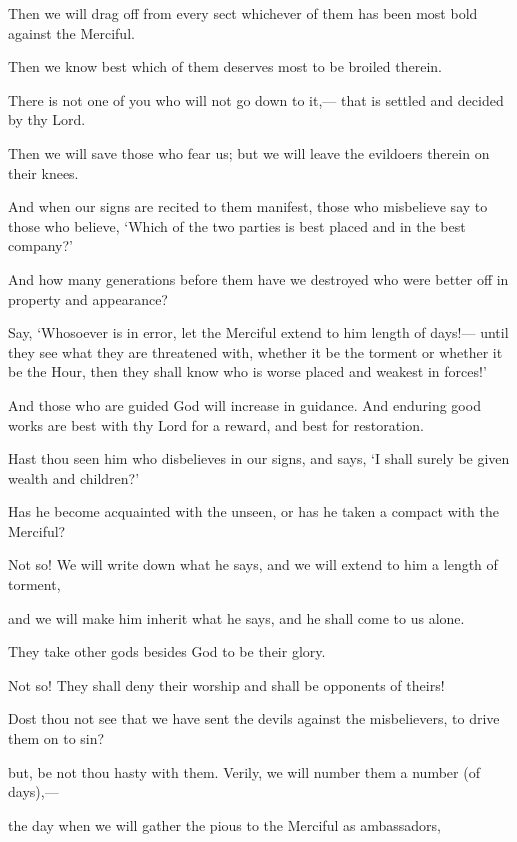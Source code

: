\documentclass[fontsize=14pt, letterpaper, notitlepage, openany, DIV=12]{scrbook} %
\begin{document}
\noindent[19:69]
Then we will drag off from every sect whichever of them has been most bold against the
Merciful.

\noindent[19:70]
Then we know best which of them deserves most to be broiled therein.

\noindent[19:71]
There is not one of you who will not go down to it,--- that is settled and decided by thy
Lord.

\noindent[19:72]
Then we will save those who fear us; but we will leave the evildoers therein on their
knees.

\noindent[19:73]
And when our signs are recited to them manifest, those who misbelieve say to those who
believe, `Which of the two parties is best placed and in the best company?'

\noindent[19:74]
And how many generations before them have we destroyed who were better off in
property and appearance?

\noindent[19:75]
Say, `Whosoever is in error, let the Merciful extend to him length of days!--- until they
see what they are threatened with, whether it be the torment or whether it be the Hour, then they
shall know who is worse placed and weakest in forces!'

\noindent[19:76]
And those who are guided God will increase in guidance. And enduring good works are
best with thy Lord for a reward, and best for restoration.

\noindent[19:77]
Hast thou seen him who disbelieves in our signs, and says, `I shall surely be given wealth
and children?'

\noindent[19:78]
Has he become acquainted with the unseen, or has he taken a compact with the Merciful?

\noindent[19:79]
Not so! We will write down what he says, and we will extend to him a length of torment,

\noindent[19:80]
and we will make him inherit what he says, and he shall come to us alone.

\noindent[19:81]
They take other gods besides God to be their glory.

\noindent[19:82]
Not so! They shall deny their worship and shall be opponents of theirs!

\noindent[19:83]
Dost thou not see that we have sent the devils against the misbelievers, to drive them on
to sin?

\noindent[19:84]
but, be not thou hasty with them. Verily, we will number them a number (of days),---

\noindent[19:85]
the day when we will gather the pious to the Merciful as ambassadors,
\end{document}
